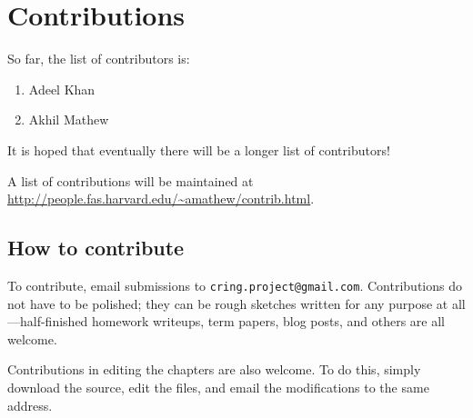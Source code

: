 \chapter*{Contributions}

So far, the list of contributors is:
\begin{enumerate}
\item Adeel Khan 
\item Akhil Mathew
\end{enumerate}

It is hoped that eventually there will be a longer list of contributors!

A list of contributions will be maintained at 
\url{http://people.fas.harvard.edu/~amathew/contrib.html}.

\section*{How to contribute}


To contribute, email submissions to \verb=cring.project@gmail.com=. 
Contributions do not have to be polished; they can be rough sketches written
for any purpose at all---half-finished homework writeups, term papers, blog
posts, and others are all welcome.

Contributions in editing the chapters are also welcome. To do this, simply
download the source, edit the files, and email the modifications to the same
address.


\fancyfoot[C]{\small \textbf{\thepage}}


